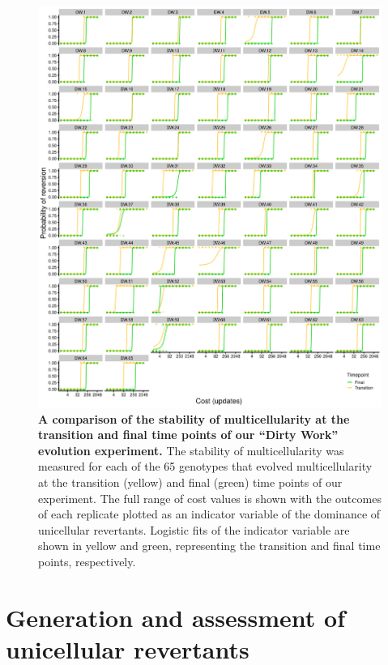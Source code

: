 \documentclass[
]{book}
\begin{document}
\begin{figure}
\centering
\includegraphics{images/Figure_S3_Dirty_work_Entrenchment_20DEC22.png}
\caption{\label{fig:dw-entrench-comparison}\textbf{A comparison of the stability of multicellularity at the transition and final time points of our ``Dirty Work'' evolution experiment.} The stability of multicellularity was measured for each of the 65 genotypes that evolved multicellularity at the transition (yellow) and final (green) time points of our experiment. The full range of cost values is shown with the outcomes of each replicate plotted as an indicator variable of the dominance of unicellular revertants. Logistic fits of the indicator variable are shown in yellow and green, representing the transition and final time points, respectively.}
\end{figure}

\hypertarget{generation-and-assessment-of-unicellular-revertants}{%
\section{Generation and assessment of unicellular revertants}\label{generation-and-assessment-of-unicellular-revertants}}
\end{document}
